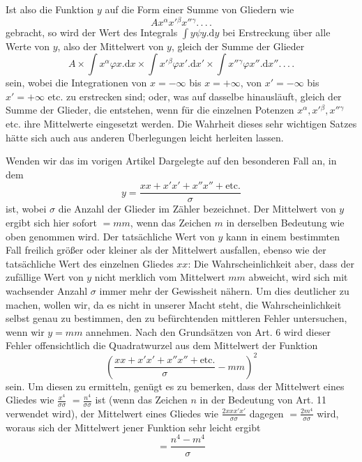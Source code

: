 Ist also die Funktion \(y\) auf die Form einer Summe von Gliedern wie
\[
Ax^\alpha x'{}^\beta x''{}^\gamma\mathord{.}\,\mathord{.}\,\mathord{.}\,\mathord{.}
\]
gebracht, so wird der Wert des Integrals \(\int y\psi y.\mathrm{d}y\) bei Erstreckung über alle Werte von \(y\), also der Mittelwert von \(y\), gleich der Summe der Glieder
\[
A\times\int x^\alpha\varphi x.\mathrm{d}x\times\int x'{}^\beta\varphi x'.\mathrm{d}x'\times\int x''{}^\gamma\varphi x''.\mathrm{d}x''\mathord{.}\,\mathord{.}\,\mathord{.}\,\mathord{.}
\]
sein, wobei die Integrationen von \(x=-\infty\) bis \(x=+\infty\), von \(x'=-\infty\) bis \(x'=+\infty\) etc. zu erstrecken sind; oder, was auf dasselbe hinausläuft, gleich der Summe der Glieder, die entstehen, wenn für die einzelnen Potenzen \(x^\alpha,x'{}^\beta,x''{}^\gamma\) etc. ihre Mittelwerte eingesetzt werden. Die Wahrheit dieses sehr wichtigen Satzes hätte sich auch aus anderen Überlegungen leicht herleiten lassen.

Wenden wir das im vorigen Artikel Dargelegte auf den besonderen Fall an, in dem
\[
y=\frac{xx+x'x'+x''x''+\text{etc.}}{\sigma}
\]
ist, wobei \(\sigma\) die Anzahl der Glieder im Zähler bezeichnet. Der Mittelwert von \(y\) ergibt sich hier sofort \(=mm\), wenn das Zeichen \(m\) in derselben Bedeutung wie oben genommen wird. Der tatsächliche Wert von \(y\) kann in einem bestimmten Fall freilich größer oder kleiner als der Mittelwert ausfallen, ebenso wie der tatsächliche Wert des einzelnen Gliedes \(xx\): Die Wahrscheinlichkeit aber, dass der zufällige Wert von \(y\) nicht merklich vom Mittelwert \(mm\) abweicht, wird sich mit wachsender Anzahl \(\sigma\) immer mehr der Gewissheit nähern. Um dies deutlicher zu machen, wollen wir, da es nicht in unserer Macht steht, die Wahrscheinlichkeit selbst genau zu bestimmen, den zu befürchtenden mittleren Fehler untersuchen, wenn wir \(y=mm\) annehmen. Nach den Grundsätzen von Art. 6 wird dieser Fehler offensichtlich die Quadratwurzel aus dem Mittelwert der Funktion
\[
\left(\frac{xx+x'x'+x''x''+\text{etc.}}{\sigma}-mm\right)^2
\]
sein. Um diesen zu ermitteln, genügt es zu bemerken, dass der Mittelwert eines Gliedes wie \(\frac{x^4}{\sigma\sigma}\) \(=\frac{n^4}{\sigma\sigma}\) ist (wenn das Zeichen \(n\) in der Bedeutung von Art. 11 verwendet wird), der Mittelwert eines Gliedes wie \(\frac{2xxx'x'}{\sigma\sigma}\) dagegen \(=\frac{2m^4}{\sigma\sigma}\) wird, woraus sich der Mittelwert jener Funktion sehr leicht ergibt
\[
=\frac{n^4-m^4}{\sigma}
\]

